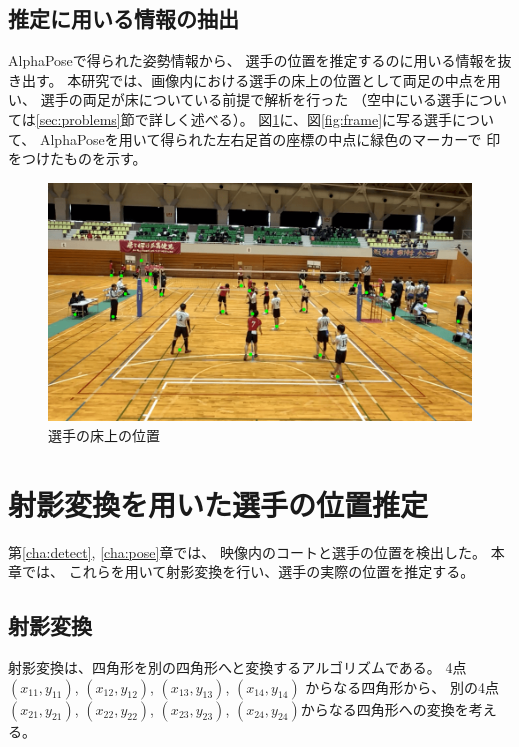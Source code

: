 \documentclass[a4j, fleqn, 12pt]{jsreport}
\begin{document}
    \section{推定に用いる情報の抽出}
        AlphaPoseで得られた姿勢情報から、
        選手の位置を推定するのに用いる情報を抜き出す。
        本研究では、画像内における選手の床上の位置として両足の中点を用い、
        選手の両足が床についている前提で解析を行った
        （空中にいる選手については\ref{sec:problems}節で詳しく述べる）。
        図\ref{fig:marker}に、図\ref{fig:frame}に写る選手について、
        AlphaPoseを用いて得られた左右足首の座標の中点に緑色のマーカーで
        印をつけたものを示す。

        \begin{figure}[ht]
            \centering
            \includegraphics[width=0.8\hsize]{images/pointed.png}
            \caption{選手の床上の位置}
            \label{fig:marker}
        \end{figure}

\chapter{射影変換を用いた選手の位置推定} \label{cha:result}
    第\ref{cha:detect}, \ref{cha:pose}章では、
    映像内のコートと選手の位置を検出した。
    本章では、
    これらを用いて射影変換を行い、選手の実際の位置を推定する。

    \section{射影変換}
        射影変換は、四角形を別の四角形へと変換するアルゴリズム\cite{kashika}である。
        4点$(x_{11}, y_{11})$, $(x_{12}, y_{12})$,
        $(x_{13}, y_{13})$, $(x_{14}, y_{14})$
        からなる四角形から、
        別の4点$(x_{21}, y_{21})$, $(x_{22}, y_{22})$, $(x_{23}, y_{23})$,
        $(x_{24}, y_{24})$からなる四角形への変換を考える。
\end{document}
